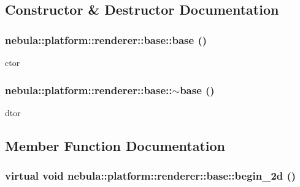 \subsection{Constructor \& Destructor Documentation}
\hypertarget{classnebula_1_1platform_1_1renderer_1_1base_a6454716289a3b7bfcf782bfb03dc7ab1}{
\subsubsection[{base}]{\setlength{\rightskip}{0pt plus 5cm}nebula::platform::renderer::base::base ()}}
\label{classnebula_1_1platform_1_1renderer_1_1base_a6454716289a3b7bfcf782bfb03dc7ab1}


ctor \hypertarget{classnebula_1_1platform_1_1renderer_1_1base_ad0b0261269c200f2ae1b705f991b56d0}{
\subsubsection[{$\sim$base}]{\setlength{\rightskip}{0pt plus 5cm}nebula::platform::renderer::base::$\sim$base ()}}
\label{classnebula_1_1platform_1_1renderer_1_1base_ad0b0261269c200f2ae1b705f991b56d0}


dtor 

\subsection{Member Function Documentation}
\hypertarget{classnebula_1_1platform_1_1renderer_1_1base_a80e8a44929910992d3c3d831978be14e}{
\subsubsection[{begin\_\-2d}]{\setlength{\rightskip}{0pt plus 5cm}virtual void nebula::platform::renderer::base::begin\_\-2d ()}}
\label{classnebula_1_1platform_1_1renderer_1_1base_a80e8a44929910992d3c3d831978be14e}



